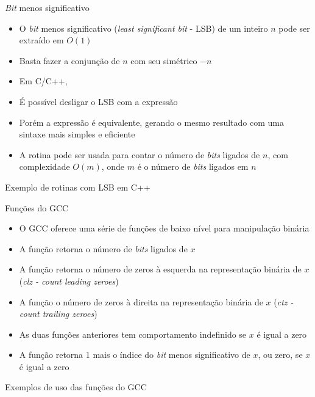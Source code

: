 \begin{frame}[fragile]{{\it Bit} menos significativo}

    \begin{itemize}
        \item O \textit{bit} menos significativo (\textit{least significant bit} - LSB) de um inteiro $n$ pode ser extraído em $O(1)$

        \item Basta fazer a conjunção de $n$ com seu simétrico $-n$

        \item Em C/C++, 

        \item É possível desligar o LSB com a expressão 

        \item Porém a expressão  é equivalente, gerando o mesmo resultado com uma sintaxe mais simples e eficiente

        \item A rotina  pode ser usada para contar o número de \textit{bits} ligados de $n$, com complexidade $O(m)$, onde $m$ é o número de \textit{bits} ligados em $n$
    \end{itemize}

\end{frame}

\begin{frame}[fragile]{Exemplo de rotinas com LSB em C++}
\end{frame}

\begin{frame}[fragile]{Funções do GCC}

    \begin{itemize}
        \item O GCC oferece uma série de funções de baixo nível para manipulação binária

        \item A função  retorna o número de \textit{bits} ligados de $x$

        \item A função  retorna o número de zeros à esquerda na representação binária de $x$ (\textit{clz - count leading zeroes})

        \item A função  o número de zeros à direita na representação binária de $x$ (\textit{ctz - count trailing zeroes})

        \item As duas funções anteriores tem comportamento indefinido se $x$ é igual a zero

        \item A função  retorna 1 mais o índice do \textit{bit} menos significativo de $x$, ou zero, se $x$ é igual a zero
    \end{itemize}

\end{frame}

\begin{frame}[fragile]{Exemplos de uso das funções do GCC}
\end{frame}

